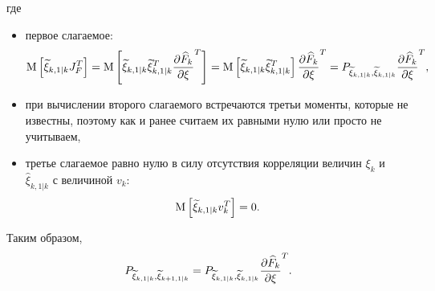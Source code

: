 где
\begin{itemize}
    \item первое слагаемое:
    $$
        \mathrm{M} \left [ \widetilde{\xi}_{k,1|k} J_F^T \right ]
            = \mathrm{M} \left [ \widetilde{\xi}_{k,1|k} \widetilde{\xi}_{k,1|k}^T \frac{\partial \widehat{F}_k}{\partial \xi}^T \right ]
            = \mathrm{M} \left [ \widetilde{\xi}_{k,1|k} \widetilde{\xi}_{k,1|k}^T \right ] \frac{\partial \widehat{F}_k}{\partial \xi}^T
            = P_{\widetilde{\xi}_{k,1|k}, \widetilde{\xi}_{k,1|k}} \frac{\partial \widehat{F}_k}{\partial \xi}^T,
    $$
    \item при вычислении второго слагаемого встречаются третьи моменты, которые не известны, поэтому как и ранее считаем их равными нулю или просто не учитываем,
    \item третье слагаемое равно нулю в силу отсутствия корреляции величин $\xi_k$ и $\widehat{\xi}_{k,1|k}$ с величиной $v_k$:
    $$
        \mathrm{M} \left [ \widetilde{\xi}_{k,1|k} v_k^T \right ] = 0.
    $$
\end{itemize}
Таким образом,
\begin{equation} \label{equation:filtering:in_states:extended_kalman:errors_covariance}
    P_{\widetilde{\xi}_{k,1|k}, \widetilde{\xi}_{k+1,1|k}} = P_{\widetilde{\xi}_{k,1|k}, \widetilde{\xi}_{k,1|k}} \frac{\partial \widehat{F}_k}{\partial \xi}^T.
\end{equation}